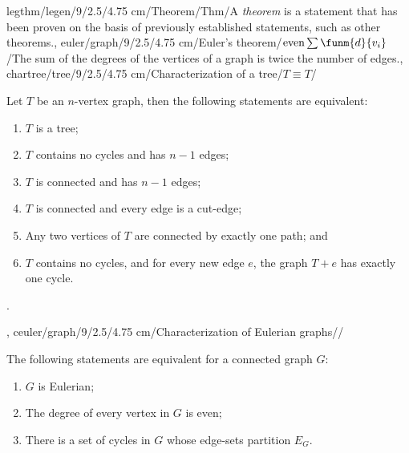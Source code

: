 legthm/legen/9/2.5/4.75 cm/Theorem/Thm/{A \emph{theorem} is a statement that has been proven on the basis of previously established statements, such as other theorems.},
euler/graph/9/2.5/4.75 cm/{Euler's theorem}/$\mbox{even}\sum{\funm{d}{v_i}}$/{The sum of the degrees of the vertices of a graph is twice the number of edges.},
chartree/tree/9/2.5/4.75 cm/{Characterization of a tree}/{$T\equiv T$}/{Let $T$ be an $n$-vertex graph, then the following statements are equivalent:\begin{enumerate}\item $T$ is a tree; \item $T$ contains no cycles and has $n-1$ edges; \item $T$ is connected and has $n-1$ edges; \item $T$ is connected and every edge is a cut-edge; \item Any two vertices of $T$ are connected by exactly one path; and \item $T$ contains no cycles, and for every new edge $e$, the graph $T+e$ has exactly one cycle.\end{enumerate}.},
ceuler/graph/9/2.5/4.75 cm/{Characterization of Eulerian graphs}/{}/{The following statements are equivalent for a connected graph $G$:\begin{enumerate}\item $G$ is Eulerian; \item The degree of every vertex in $G$ is even; \item There is a set of cycles in $G$ whose edge-sets partition $E_G$.\end{enumerate}}